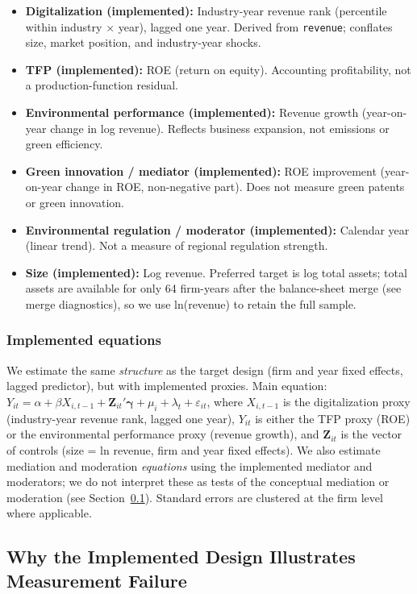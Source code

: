 \begin{itemize}
  \item \textbf{Digitalization (implemented):} Industry-year revenue rank (percentile within industry $\times$ year), lagged one year. Derived from \texttt{revenue}; conflates size, market position, and industry-year shocks.
  \item \textbf{TFP (implemented):} ROE (return on equity). Accounting profitability, not a production-function residual.
  \item \textbf{Environmental performance (implemented):} Revenue growth (year-on-year change in log revenue). Reflects business expansion, not emissions or green efficiency.
  \item \textbf{Green innovation / mediator (implemented):} ROE improvement (year-on-year change in ROE, non-negative part). Does not measure green patents or green innovation.
  \item \textbf{Environmental regulation / moderator (implemented):} Calendar year (linear trend). Not a measure of regional regulation strength.
  \item \textbf{Size (implemented):} Log revenue. Preferred target is log total assets; total assets are available for only 64 firm-years after the balance-sheet merge (see merge diagnostics), so we use ln(revenue) to retain the full sample.
\end{itemize}

\subsubsection{Implemented equations}

We estimate the same \emph{structure} as the target design (firm and year fixed effects, lagged predictor), but with implemented proxies. Main equation: $Y_{it} = \alpha + \beta X_{i,t-1} + \mathbf{Z}_{it}'\boldsymbol{\gamma} + \mu_i + \lambda_t + \varepsilon_{it}$, where $X_{i,t-1}$ is the digitalization proxy (industry-year revenue rank, lagged one year), $Y_{it}$ is either the TFP proxy (ROE) or the environmental performance proxy (revenue growth), and $\mathbf{Z}_{it}$ is the vector of controls (size = ln revenue, firm and year fixed effects). We also estimate mediation and moderation \emph{equations} using the implemented mediator and moderators; we do not interpret these as tests of the conceptual mediation or moderation (see Section~\ref{sec:why-gap}). Standard errors are clustered at the firm level where applicable.

\subsection{Why the Implemented Design Illustrates Measurement Failure}
\label{sec:why-gap}

